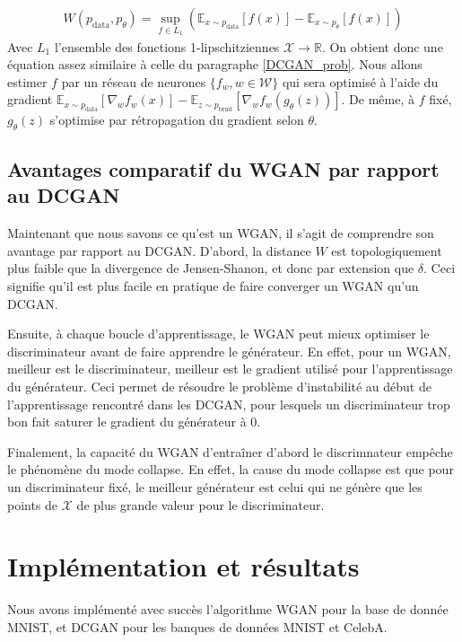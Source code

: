 $$\begin{aligned}
W(p_{\mathrm{data}}, p_{\theta}) = \sup_{f \in L_{1}}\left(\mathbb{E}_{x\sim p_{\mathrm{data}}} [f(x)] - \mathbb{E}_{x\sim p_{\theta}} [f(x)]\right)
\end{aligned}$$
 Avec $L_{1}$ l'ensemble des fonctions 1-lipschitziennes $\mathcal{X} \longrightarrow \mathbb{R}$. On obtient donc une équation assez similaire à celle du paragraphe \ref{DCGAN_prob}. Nous allons estimer $f$ par un réseau de neurones $\{f_{w}, w \in \mathcal{W} \}$ qui sera optimisé à l'aide du gradient $\mathbb{E}_{x\sim p_{\mathrm{data}}} \left[\nabla_{w}f_{w}(x)\right] - \mathbb{E}_{z\sim p_{\mathrm{bruit}}} \left[\nabla_{w}f_{w}(g_{\theta}(z))\right]$. De même, à $f$ fixé, $g_{\theta}(z)$ s'optimise par rétropagation du gradient selon $\theta$.
 
 \subsection{Avantages comparatif du WGAN par rapport au DCGAN}
 
Maintenant que nous savons ce qu'est un WGAN, il s'agit de comprendre son avantage par rapport au DCGAN. D'abord, la distance $W$ est topologiquement plus faible que la divergence de Jensen-Shanon, et donc par extension que $\delta$. Ceci signifie qu'il est plus facile en pratique de faire converger un WGAN qu'un DCGAN.

Ensuite, à chaque boucle d'apprentissage, le WGAN peut mieux optimiser le discriminateur avant de faire apprendre le générateur. En effet, pour un WGAN, meilleur est le discriminateur, meilleur est le gradient utilisé pour l'apprentissage du générateur. Ceci permet de résoudre le problème d'instabilité au début de l'apprentissage rencontré dans les DCGAN, pour lesquels un discriminateur trop bon fait saturer le gradient du générateur à 0.

Finalement, la capacité du WGAN d'entraîner d'abord le discrimnateur empêche le phénomène du mode collapse. En effet, la cause du mode collapse est que pour un discriminateur fixé, le meilleur générateur est celui qui ne génère que les points de $\mathcal{X}$ de plus grande valeur pour le discriminateur.

\section{Implémentation et résultats}

Nous avons implémenté avec succès l'algorithme WGAN pour la base de donnée MNIST, et  DCGAN pour les banques de données MNIST et CelebA. 

